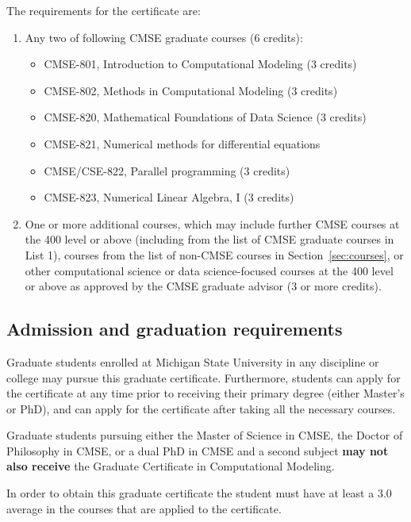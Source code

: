 \vspace{2mm}
\noindent
The requirements for the certificate are:

\begin{enumerate}
\item Any two of following CMSE graduate courses (6 credits):  

\begin{itemize}
    \item  CMSE-801, Introduction to Computational Modeling (3 credits)
    \item  CMSE-802, Methods in Computational Modeling (3 credits)  
    \item  CMSE-820, Mathematical Foundations of Data Science (3 credits)  
    \item  CMSE-821, Numerical methods for differential equations
    \item  CMSE/CSE-822, Parallel programming (3 credits) 
    \item  CMSE-823, Numerical Linear Algebra, I (3 credits)
\end{itemize}

\item One or more additional courses, which may include further CMSE
  courses at the 400 level or above (including from the list of 
  CMSE graduate courses in List 1), courses from the list of non-CMSE
  courses  in Section~\ref{sec:courses}, or other computational
  science or data science-focused courses at the 400 level or above as
  approved by the CMSE graduate advisor (3 or more credits).

\end{enumerate}

\subsection{Admission and graduation requirements}

Graduate students enrolled at Michigan State University in any
discipline or college may pursue this graduate certificate.
Furthermore, students can apply for the certificate at any time prior
to receiving their primary degree (either Master’s or PhD), and can
apply for the certificate after taking all the necessary courses.

Graduate students pursuing either the Master of Science in CMSE, the
Doctor of Philosophy in CMSE, or a dual PhD in CMSE and a second
subject \textbf{may not also receive} the Graduate Certificate in
Computational Modeling.

In order to obtain this graduate certificate the student must have at
least a 3.0 average in the courses that are applied to the
certificate.


